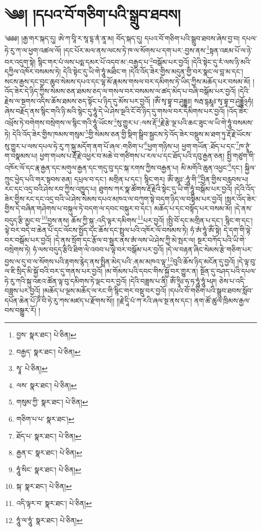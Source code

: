 \setcounter{footnote}{0} 
\chapter{༄༅། །དཔའ་བོ་གཅིག་པའི་སྒྲུབ་ཐབས།}༄༅༅། །རྒྱ་གར་སྐད་དུ། ཨེ་ཀ་བཱི་ར་སཱ་དྷ་ནཾ་ནཱ་མ། བོད་སྐད་དུ། དཔའ་བོ་གཅིག་པའི་སྒྲུབ་ཐབས་ཞེས་བྱ་བ། དཔལ་ཧེ་རུ་ཀ་ལ་ཕྱག་འཚལ་ལོ། །དང་པོར་མལ་ནས་ལངས་ཏེ་ཁ་ལ་སོགས་པ་དག་པར་:བྱས་ནས་\footnote{བྱས་  སྣར་ཐང་།  པེ་ཅིན། }སྟན་འཇམ་པོ་ལ་ཉེ་བར་འདུག་སྟེ། སྙིང་གར་པཾ་ལས་པདྨ་དམར་པོ་འདབ་མ་:བརྒྱད་པ་\footnote{བརྒྱད་  སྣར་ཐང་།  པེ་ཅིན། }བསྒོམ་པར་བྱའོ། །དེའི་སྟེང་དུ་རཾ་ལས་ཉི་མའི་དཀྱིལ་འཁོར་བསམས་ཏེ། དེའི་སྟེང་དུ་ཡི་གེ་ཧཱུཾ་མཐིང་ག །དེའི་འོད་ཟེར་གྱིས་མདུན་གྱི་བར་སྣང་ལ་བླ་མ་དང་། སངས་རྒྱས་དང་བྱང་ཆུབ་སེམས་དཔའ་དང་ལྷ་མོ་རྣམས་གསལ་བར་དམིགས་ཏེ་ཡིད་ཀྱིས་མཆོད་པར་བསམ་མོ། །འོད་ཟེར་དེ་ཉིད་ཀྱིས་སེམས་ཅན་ཐམས་ཅད་ལ་གསལ་བར་བསམས་ལ་ཚད་མེད་པ་བཞི་བསྒོམ་པར་བྱའོ། །དེའི་རྗེས་ལ་སྔགས་འདིས་ཆོས་ཐམས་ཅད་སྟོང་པ་ཉིད་དུ་མོས་པར་བྱའོ། །ཨོཾ་སྭ་བྷཱ་བ་ཤུདྡྷཿ། སརྦ་དྷརྨཱཿ་སྭ་བྷཱ་བ་ཤུདྡྷོ྅ཧཾ། ཞེས་བརྗོད་ནས་སྙིང་གའི་ཉི་མའི་སྙེང་དུ་ཧཱུཾ་དེ་ཡེ་ཤེས་ལྔའི་ངོ་བོ་ཉིད་དུ་གསལ་བར་དམིགས་པར་བྱའོ། །འོད་ཟེར་འཕྲོས་ཏེ་བགེགས་བསྲེགས་ལ་སྙིང་གའི་ཧཱུཾ་ཡོངས་\footnote{སྭཱ་  པེ་ཅིན། }སུ་གྱུར་པ་:ལས་རྡོ་\footnote{ལས་  སྣར་ཐང་།  པེ་ཅིན། }རྗེ་རྩེ་ལྔ་པའི་ཆང་ཟུང་ལ་ཡི་གེ་ཧཱུཾ་བསམས་ཏེ། དེའི་འོད་ཟེར་གྱིས་ཁམས་གསུམ་\footnote{གསུམ་ཀྱི་  སྣར་ཐང་།  པེ་ཅིན། }གྱི་སེམས་ཅན་གྱི་སྡིག་སྒྲིབ་སྦྱངས་ཏེ་འོད་ཟེར་བསྡུས་མ་ཐག་ཏུ་རྡོ་རྗེ་ཡོངས་སུ་གྱུར་པ་ལས་དཔལ་ཧེ་རུ་ཀ་སྐུ་མདོག་ནག་པོ་ཞལ་:གཅིག་པ་\footnote{གཅིག་པ་པ་  སྣར་ཐང་། }ཕྱག་གཉིས་པ། ཕྱག་གཡོན་:ཐོད་པ་དང་\footnote{ཐོད་པ་  སྣར་ཐང་།  པེ་ཅིན། }ཁ་ཊྭཱཾ་ག་བསྣམས་པ། ཕྱག་གཡས་པ་རྡོ་རྗེ་འཕྱར་བ་མཆེ་བ་གཙིགས་པ་རལ་པ་དང་ཐོད་པའི་དབུ་རྒྱན་ཅན། སྤྱི་གཙུག་གི་འཁོར་ལོ་དང་རྣ་རྒྱན་དང་མགུལ་རྒྱན་དང་གདུ་བུ་དང་སྐ་རགས་ཀྱིས་བརྒྱན་པ། མི་མགོའི་ཆུན་འཕྱང་\footnote{རྒྱན་ང་  སྣར་ཐང་།  པེ་ཅིན། }དང་། སྐྱིལ་ཀྲུང་ཕྱེད་པའི་གར་སྟབས་ཅན། དཔྲལ་བ་དང་། མགྲིན་པ་དང་། སྙིང་གར། ཨོཾ་ཨཱཿ་:ཧཱུཾ་གི་\footnote{ཧཱུཾ་སིང་  སྣར་ཐང་།  པེ་ཅིན། }བྱིན་གྱིས་བརླབས་པ། རང་དང་འདྲ་བའི་ཤེས་རབ་ཀྱིས་འཁྱུད་པ། ཐུགས་ཀར་སྣ་ཚོགས་རྡོ་རྗེའི་སྟེང་དུ་ཡི་གེ་ཧཱུཾ་བསྒོམ་པར་བྱའོ། །དེའི་འོད་ཟེར་གྱིས་རང་དང་འདྲ་བའི་ཡེ་ཤེས་སེམས་དཔའ་མཁའ་ལ་བཀུག་སྟེ་བདག་ཉིད་ལ་བསྟིམ་པར་བྱའོ། །སླར་འོད་ཟེར་གྱིས་དེ་བཞིན་གཤེགས་པ་བསྐུལ་ཏེ་བདག་ལ་དབང་བསྐུར་བ་དང་། མཆོད་པ་དང་བསྟོད་པར་བསམ་མོ། །དེ་ནས་བདུད་རྩི་མྱང་བ་\footnote{སྐ་  སྣར་ཐང་།  པེ་ཅིན། }བྱས་ནས། ཆོས་ཀྱི་སྐུ་:འདི་ལྟར་དམིགས་\footnote{འདི་ལྟར་བ་  སྣར་ཐང་།  པེ་ཅིན། }པར་བྱའོ། །སྤྱི་བོ་དང་མགྲིན་པ་དང་། སྙིང་ག་དང་། ལྟེ་བར་བདེ་བ་ཆེན་པོ་དང་ལོངས་སྤྱོད་དང་ཆོས་དང་སྤྲུལ་པའི་འཁོར་ལོ་བསམས་ཏེ། ཧཾ་ཨཾ་ཧཱུཾ་ཨོཾ་སྟེ། དེ་དག་གི་ལྟེ་བར་བསྒོམ་པར་བྱའོ། །དེ་ནས་སྲོག་དང་རྩོལ་བ་སྦྱར་ནས་ཨཾ་ལས་ཡེ་ཤེས་ཀྱི་མེ་སྤར་ལ། སྔར་བཀོད་པའི་ཡི་གེ་བསྲེགས་ཏེ། ཧཾ་ལས་བདུད་རྩིའི་ཐིག་ལེ་འབབ་པ་ལྟེ་བར་བསྒོམ་པར་བྱའོ། །དེ་ལ་བརྟན་ཞིང་སེམས་རྩེ་གཅིག་པར་བྱས་ལ་དུ་བ་ལ་སོགས་པའི་རྟགས་རྙེད་ནས་སྤྲིན་མེད་པའི་:ནམ་མཁའ་ལྟ་\footnote{ཧཱུཾ་ལ་ཧཱུཾ་  སྣར་ཐང་།  པེ་ཅིན། }བུའི་ཆོས་ཉིད་མངོན་དུ་བྱའོ། །དེ་ལྟ་བུ་ལ་ཇི་སྲིད་མི་སྐྱོ་བའི་བར་དུ་གནས་པར་བྱའོ། །མ་གོམས་པའི་དབང་གིས་སྐྱོ་བར་གྱུར་ན། སྔོན་དུ་བཤད་པའི་དཔལ་ཧེ་རུ་ཀའི་སྐུ་འཇའ་ཚོན་ལྟ་བུ་དམིགས་ཏེ་ལྡང་བར་བྱའོ། །དེའི་བཟླས་པ་ནི། ཨོཾ་ཧྲཱིཿ་ཧ་ཧ་ཧཱུཾ་ཧཱུཾ་ཕཊ། ཅེས་པ་འདི་བཟླས་པར་བྱའོ། །མཆོད་པ་ལྔས་མཆོད་ལ་རང་གི་སྙིང་གར་བསྡུ་བར་བྱའོ། །དཔའ་བོ་གཅིག་པའི་སྒྲུབ་ཐབས་སློབ་དཔོན་ཆེན་པོ་ཌོཾ་བི་ཧེ་རུ་ཀས་མཛད་པ་རྫོགས་སོ།། །།རྗེ་དཱི་པཾ་ཀ་རའི་ཞལ་སྔ་ནས་དང་། ནག་ཚོ་ཚུལ་ཁྲིམས་རྒྱལ་བས་བསྒྱུར་རོ། ། 